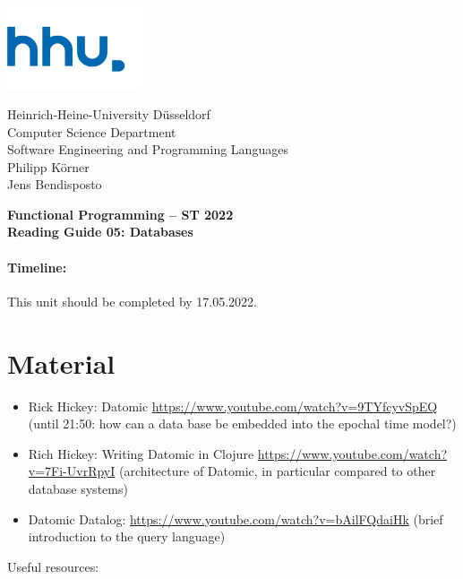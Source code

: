\documentclass[11pt,a4paper]{article}
\begin{document}
\begin{minipage}[b]{\textwidth}
	\parbox[t]{5cm}{%
		\includegraphics[width=4cm]{unilogo}
		\hfill
	}
	\parbox[b]{11cm}{%
		Heinrich-Heine-University D\"usseldorf\\
		Computer Science Department\\
		Software Engineering and Programming Languages\\
		Philipp K\"orner \\
        Jens Bendisposto
	}
\end{minipage}
\begin{center}
	\bf
	Functional Programming -- ST 2022\\
    Reading Guide 05: Databases
\end{center}

\pagestyle{empty}

\paragraph{Timeline:} This unit should be completed by 17.05.2022.

\section{Material} 

\renewcommand{\labelenumi}{\Alph{enumi}}
\begin{itemize}    
	
	\item Rick Hickey: Datomic \url{https://www.youtube.com/watch?v=9TYfcyvSpEQ}
    (until 21:50: how can a data base be embedded into the epochal time model?)
	
	\item Rich Hickey: Writing Datomic in Clojure \url{https://www.youtube.com/watch?v=7Fi-UvrRpyI}
    (architecture of Datomic, in particular compared to other database systems)
	
    \item Datomic Datalog: \url{https://www.youtube.com/watch?v=bAilFQdaiHk}
    (brief introduction to the query language)
\end{itemize} 

Useful resources:
\end{document}
